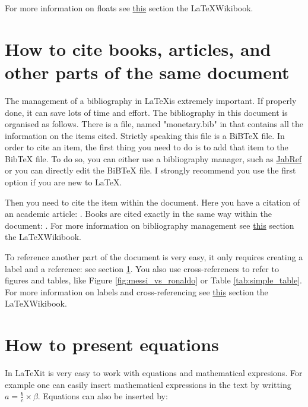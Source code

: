 \documentclass[11pt,a4paper,oneside]{book}
\newcommand{\latex}{\LaTeX{}} %
\begin{document}
For more information on floats see \href{https://en.wikibooks.org/wiki/LaTeX/Floats,_Figures_and_Captions}{this} section the \latex Wikibook.

\section{How to cite books, articles, and other parts of the same document}
\label{sec:citations}
The management of a bibliography in \latex is extremely important. If properly done, it can save lots of time and effort. The bibliography in this document is organised as follows. There is a file, named "monetary.bib" in that contains all the information on the items cited. Strictly speaking this file is a BiBTeX file. In order to cite an item, the first thing you need to do is to add that item to the BibTeX file. To do so, you can either use a bibliography manager, such as \href{http://www.jabref.org/}{JabRef} or you can directly edit the BiBTeX file. I strongly recommend you use the first option if you are new to \latex.

Then you need to cite the item within the document. Here you have a citation of an academic article: \citet*{Cooley_Hansen_1989}. Books are cited exactly in the same way within the document: \citet*{Blanchard_2017}. For more information on bibliography management see \href{https://en.wikibooks.org/wiki/LaTeX/Bibliography_Management}{this} section the \latex Wikibook.

To reference another part of the document is very easy, it only requires creating a label and a reference: see section \ref{sec:citations}. You also use cross-references to refer to figures and tables, like Figure \ref{fig:messi_vs_ronaldo} or Table \ref{tab:simple_table}. For more information on labels and cross-referencing see \href{https://en.wikibooks.org/wiki/LaTeX/Labels_and_Cross-referencing}{this} section the \latex Wikibook.

\section{How to present equations}
\label{sec:math}
In \latex it is very easy to work with equations and mathematical expresions. For example one can easily insert mathematical expressions in the text by writting $ a = \frac{b}{c} \times \beta $. Equations can also be inserted by:
\end{document}

